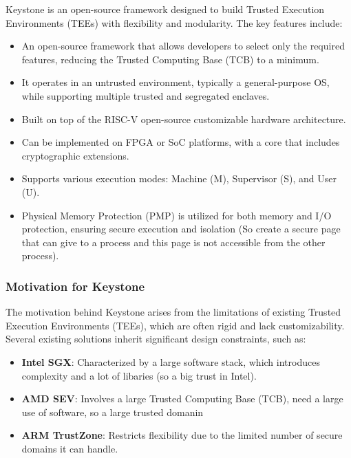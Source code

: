 Keystone is an open-source framework designed to build Trusted Execution Environments (TEEs) with flexibility and modularity. The key features include:

\begin{itemize}
    \item An open-source framework that allows developers to select only the required features, reducing the Trusted Computing Base (TCB) to a minimum.
    \item It operates in an untrusted environment, typically a general-purpose OS, while supporting multiple trusted and segregated enclaves.
\end{itemize}
\begin{itemize}
    \item Built on top of the RISC-V open-source customizable hardware architecture.
    \item Can be implemented on FPGA or SoC platforms, with a core that includes cryptographic extensions.
    \item Supports various execution modes: Machine (M), Supervisor (S), and User (U).
    \item Physical Memory Protection (PMP) is utilized for both memory and I/O protection, ensuring secure execution and isolation (So create a secure page that can give to a process and this page is not accessible from the other process).
\end{itemize}

\subsubsection{Motivation for Keystone}

The motivation behind Keystone arises from the limitations of existing Trusted Execution Environments (TEEs), which are often rigid and lack customizability. Several existing solutions inherit significant design constraints, such as:

\begin{itemize}
    \item \textbf{Intel SGX}: Characterized by a large software stack, which introduces complexity and a lot of libaries (so a big trust in Intel).
    \item \textbf{AMD SEV}: Involves a large Trusted Computing Base (TCB), need a large use of software, so a large trusted domanin
    \item \textbf{ARM TrustZone}: Restricts flexibility due to the limited number of secure domains it can handle.
\end{itemize}

